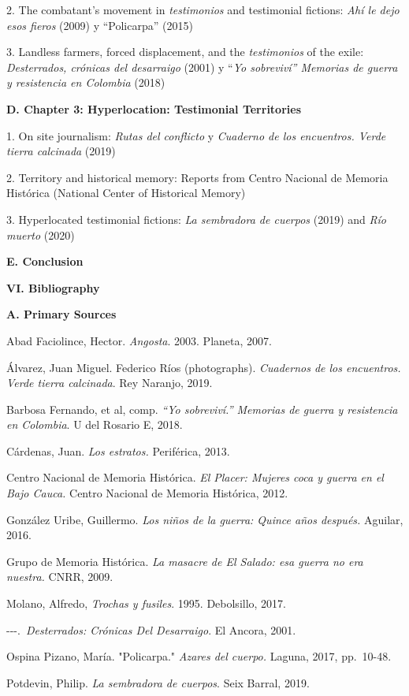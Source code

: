 \documentclass[
  11pt,
,
onecolumn,
openany
]{book}
\begin{document}
2. The combatant's movement in \emph{testimonios} and testimonial fictions:
\emph{Ahí le dejo esos fieros} (2009) y ``Policarpa'' (2015)

3. Landless farmers, forced displacement, and the \emph{testimonios} of the
exile: \emph{Desterrados, crónicas del desarraigo} (2001) y ``\emph{Yo
sobreviví'' Memorias de guerra y resistencia en Colombia} (2018)~

\textbf{D. Chapter 3: Hyperlocation: Testimonial Territories}

1. On site journalism: \emph{Rutas del conflicto} y \emph{Cuaderno de los
encuentros. Verde tierra calcinada} (2019)\emph{~}

2. Territory and historical memory: Reports from Centro Nacional de Memoria
Histórica (National Center of Historical Memory)

3. Hyperlocated testimonial fictions: \emph{La sembradora de cuerpos} (2019)
and \emph{Río muerto} (2020)

\textbf{E. Conclusion}

\textbf{VI. Bibliography}

\textbf{A. Primary Sources}

Abad Faciolince, Hector. \emph{Angosta}. 2003. Planeta, 2007.

Álvarez, Juan Miguel. Federico Ríos (photographs). \emph{Cuadernos de los
encuentros. Verde tierra calcinada}. Rey Naranjo, 2019.

Barbosa Fernando, et al, comp. \emph{``Yo sobreviví.'' Memorias de guerra y
resistencia en Colombia}. U del Rosario E, 2018.

Cárdenas, Juan. \emph{Los estratos.} Periférica, 2013.

Centro Nacional de Memoria Histórica. \emph{El Placer: Mujeres coca y guerra
en el Bajo Cauca.} Centro Nacional de Memoria Histórica, 2012.

González Uribe, Guillermo. \emph{Los niños de la guerra: Quince años después.}
Aguilar, 2016.

Grupo de Memoria Histórica. \emph{La masacre de El Salado: esa guerra no era
nuestra.} CNRR, 2009.

Molano, Alfredo, \emph{Trochas y fusiles}. 1995. Debolsillo, 2017.

-\/-\/-.~\emph{Desterrados: Crónicas Del Desarraigo}. El Ancora, 2001.

Ospina Pizano, María. "Policarpa." \emph{Azares del cuerpo.} Laguna, 2017,
pp.~10-48.

Potdevin, Philip. \emph{La sembradora de cuerpos}. Seix Barral, 2019.
\end{document}
